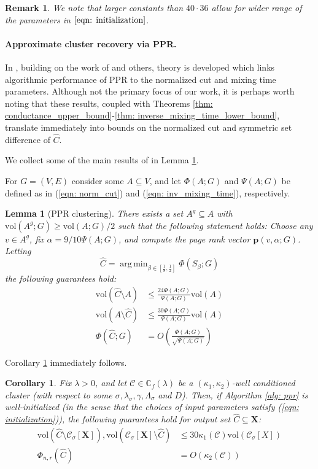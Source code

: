 \documentclass{article}
\newcommand{\vol}{\mathrm{vol}}
\newcommand{\1}{\mathbf{1}}
\newcommand{\pbf}{\mathbf{p}}
\newcommand{\Xbf}{\mathbf{X}}
\newcommand{\Cbb}{\mathbb{C}}
\newcommand{\Cset}{\mathcal{C}}
\newcommand{\Csig}{\Cset_{\sigma}}
\DeclareMathOperator*{\argmin}{arg\,min}
\theoremstyle{aldenthm}
\newtheorem{lemma}{Lemma}
\newtheorem{corollary}{Corollary}
\theoremstyle{aldenrmrk}
\newtheorem{remark}{Remark}
\begin{document}
\begin{remark}
	We note that larger constants than $40 \cdot 36$ allow for wider range of the parameters in $\eqref{eqn: initialization}$. 
\end{remark}
\paragraph{Approximate cluster recovery via PPR.}

In \cite{zhu2013}, building on the work of \cite{andersen2006} and others, theory is developed which links algorithmic performance of PPR to the normalized cut and mixing time parameters. Although not the primary focus of our work, it is perhaps worth noting that these results, coupled with Theorems \ref{thm: conductance_upper_bound}-\ref{thm: inverse_mixing_time_lower_bound}, translate immediately into bounds on the normalized cut and symmetric set difference of $\widehat{C}$.  

We collect some of the main results of \cite{zhu2013} in Lemma \ref{lem: ppr_cluster}.

For $G = (V,E)$ consider some $A \subseteq V$, and let $\Phi(A; G)$ and $\Psi(A; G)$ be defined as in (\ref{eqn: norm_cut}) and (\ref{eqn: inv_mixing_time}), respectively.
\begin{lemma}[PPR clustering]
	\label{lem: ppr_cluster}
	There exists a set $A^g \subseteq A$ with $\vol(A^g;G) \geq \vol(A;G)/2$ such that the following statement holds: Choose any $v \in A^g$, fix $\alpha = 9 / 10 \Psi(A; G)$, and compute the page rank vector $\pbf(v,\alpha; G)$. Letting 
	\begin{equation*}
	\widehat{C} = \argmin_{\beta \in [\frac{1}{8}, \frac{1}{2}]} \Phi(S_{\beta}; G)
	\end{equation*}
	the following guarantees hold:
	\begin{align*}
	\vol(\widehat{C} \setminus A) & \leq \frac{24 \Phi(A; G)}{\Psi(A; G)} \vol(A) \\
	\vol(A \setminus \widehat{C})  & \leq \frac{30 \Phi(A; G)}{\Psi(A; G)} \vol(A) \\
	\Phi(\widehat{C}; G) & = O\left(\frac{\Phi(A; G)}{\sqrt{\Psi(A; G)}}\right)
	\end{align*}
\end{lemma}

Corollary \ref{cor: ppr_cluster} immediately follows.
\begin{corollary}
	\label{cor: ppr_cluster}
	Fix $\lambda > 0$, and let $\Cset \in \Cbb_f(\lambda)$ be a $(\kappa_1,\kappa_2)$-well conditioned cluster (with respect to some $\sigma, \lambda_{\sigma}, \gamma, \Lambda_{\sigma}$ and $D$). Then, if Algorithm \ref{alg: ppr} is well-initialized (in the sense that the choices of input parameters satisfy (\ref{eqn: initialization})), the following guarantees hold for output set $\widehat{C} \subseteq \Xbf$:
	\begin{align*}
	\vol(\widehat{C} \setminus \Csig[\Xbf]), \vol(\Csig[\Xbf] \setminus \widehat{C})  & \leq 30 \kappa_1(\Cset) \vol(\Csig[X]) \\
	\Phi_{n,r}(\widehat{C}) & = O\left(\kappa_2(\Cset)\right)
	\end{align*}
\end{corollary} 
\end{document}
